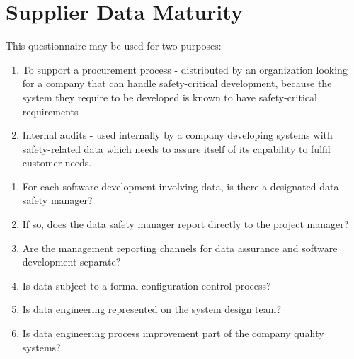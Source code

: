 %
%
\chapter{Supplier Data Maturity} \label{bkm:maturity}


This questionnaire may be used for two purposes:
\begin{enumerate}
  \item To support a procurement process - distributed by an organization looking for a company that can handle safety-critical development, because the system they require to be developed is known to have safety-critical requirements
  \item Internal audits - used internally by a company developing systems with safety-related data which needs to assure itself of its capability to fulfil customer needs.
\end{enumerate}

\begin{enumerate}
  \item For each software development involving data, is there a designated data safety manager?
  \item If so, does the data safety manager report directly to the project manager?
  \item Are the management reporting channels for data assurance and software development separate?
  \item Is data subject to a formal configuration control process? 
  \item Is data engineering represented on the system design team?
  \item Is data engineering process improvement part of the company quality systems?
\end{enumerate}

